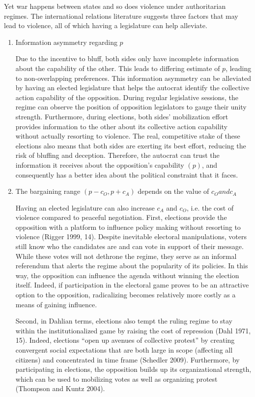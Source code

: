 Yet war happens between states and so does violence under authoritarian regimes. The international relations literature suggests three factors that may lead to violence, all of which having a legislature can help alleviate.

\begin{enumerate}
\item Information asymmetry regarding $p$

Due to the incentive to bluff, both sides only have incomplete information about the capability of the other. This leads to differing estimate of $p$, leading to non-overlapping preferences. This information asymmetry can be alleviated by having an elected legislature that helps the autocrat identify the collective action capability of the opposition. During regular legislative sessions, the regime can observe the position of opposition legislators to gauge their unity strength. Furthermore, during elections, both sides’ mobilization effort provides information to the other about its collective action capability without actually resorting to violence. The real, competitive stake of these elections also means that both sides are exerting its best effort, reducing the risk of bluffing and deception. Therefore, the autocrat can trust the information it receives about the opposition’s capability $(p)$, and consequently has a better idea about the political constraint that it faces.

\item The bargaining range $(p - c_O, p + c_A)$ depends on the value of $c_O and c_A$

Having an elected legislature can also increase $c_A$ and $c_O$, i.e. the cost of violence compared to peaceful negotiation. First, elections provide the opposition with a platform to influence policy making without resorting to violence (Rigger 1999, 14). Despite inevitable electoral manipulations, voters still know who the candidates are and can vote in support of their message. While these votes will not dethrone the regime, they serve as an informal referendum that alerts the regime about the popularity of its policies. In this way, the opposition can influence the agenda without winning the election itself. Indeed, if participation in the electoral game proves to be an attractive option to the opposition, radicalizing becomes relatively more costly as a means of gaining influence.

Second, in Dahlian terms, elections also tempt the ruling regime to stay within the institutionalized game by raising the cost of repression (Dahl 1971, 15). Indeed, elections “open up avenues of collective protest” by creating convergent social expectations that are both large in scope (affecting all citizens) and concentrated in time frame (Schedler 2009). Furthermore, by participating in elections, the opposition builds up its organizational strength, which can be used to mobilizing votes as well as organizing protest (Thompson and Kuntz 2004).


\end{enumerate}
